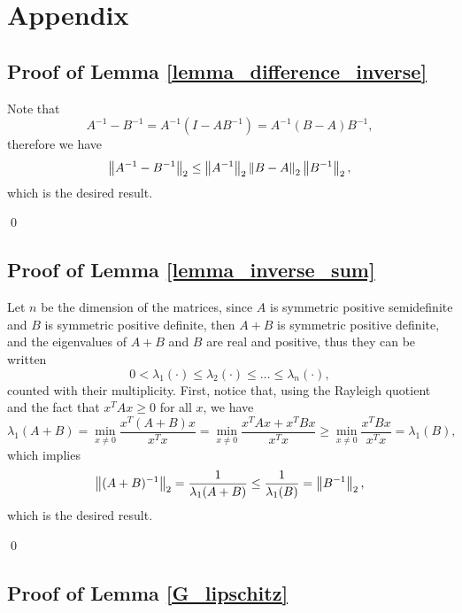 \section*{Appendix}

\subsection*{Proof of Lemma \ref{lemma_difference_inverse}}

Note that
\[ A^{-1} - B^{-1} = A^{-1} (I - A B^{-1}) = A^{-1} (B - A) B^{-1}, \]
therefore we have
\[ \left\|A^{-1} - B^{-1}\right\|_2 \le \left\|A^{-1}\right\|_2 \left\|B - A\right\|_2 \left\|B^{-1}\right\|_2, \]
which is the desired result.

\qed

\subsection*{Proof of Lemma \ref{lemma_inverse_sum}}

Let $n$ be the dimension of the matrices, since $A$ is symmetric positive semidefinite and $B$ is symmetric positive definite, then $A + B$ is symmetric positive definite, and the eigenvalues of $A + B$ and $B$ are real and positive, thus they can be written
\[ 0 < \lambda_1(\cdot) \le \lambda_2(\cdot) \le \dots \le \lambda_n(\cdot), \]
counted with their multiplicity.
First, notice that, using the Rayleigh quotient and the fact that $x^T A x \ge 0$ for all $x$, we have
\[ \lambda_1(A + B) = \min_{x \neq 0} \frac{x^T(A + B)x}{x^T x} = \min_{x \neq 0} \frac{x^T A x + x^T B x}{x^T x} \ge \min_{x \neq 0} \frac{x^T B x}{x^T x} = \lambda_1(B), \]
which implies
\[ \left\|(A + B)^{-1}\right\|_2 = \frac{1}{\lambda_1(A + B)} \le \frac{1}{\lambda_1(B)} = \left\|B^{-1}\right\|_2, \]
which is the desired result.

\qed

\subsection*{Proof of Lemma \ref{G_lipschitz}}

